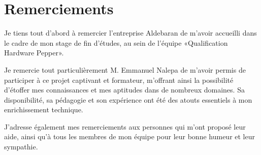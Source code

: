 \chapter*{Remerciements}

Je tiens tout d'abord à remercier l'entreprise Aldebaran de m'avoir accueilli dans le cadre de mon stage de fin d'études, au sein de l'équipe «Qualification Hardware Pepper».
\newline 

Je remercie tout particulièrement M. Emmanuel Nalepa de m'avoir permis de participer à ce projet captivant et formateur, m’offrant ainsi la possibilité d'étoffer mes connaissances et mes aptitudes dans de nombreux domaines. Sa disponibilité, sa pédagogie et son expérience ont été des atouts essentiels à mon enrichissement technique.
\newline

J’adresse également mes remerciements aux personnes qui m'ont proposé leur aide, ainsi qu'à tous les membres de mon équipe pour leur bonne humeur et leur sympathie.